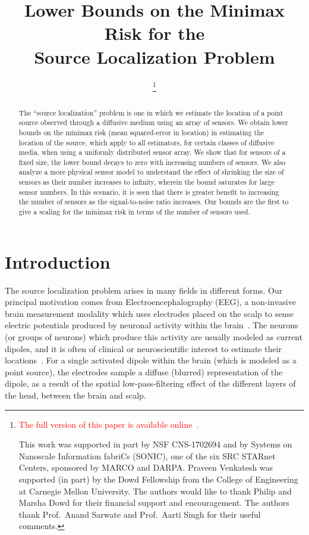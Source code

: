 \documentclass[conference,letterpaper]{IEEEtran}
\title{Lower Bounds on the Minimax Risk for the \\ Source Localization Problem}
\author{
	\IEEEauthorblockN{
		Praveen Venkatesh (\texttt{vpraveen@cmu.edu}) %
		and Pulkit Grover (\texttt{pulkit@cmu.edu}) %
	}
	\IEEEauthorblockA{
		Electrical \& Computer Engineering,
		and the Center for the Neural Basis of Cognition,
		Carnegie Mellon University
	}
	\thanks{
	\textcolor{red}{The full version of this paper is available online~\cite{FullVersion}.}

	This work was supported in part by NSF CNS-1702694 and by Systems on
	Nanoscale Information fabriCs (SONIC), one of the six SRC STARnet Centers,
	sponsored by MARCO and DARPA.  Praveen Venkatesh was supported (in part) by
	the Dowd Fellowship from the College of Engineering at Carnegie Mellon
	University.  The authors would like to thank Philip and Marsha Dowd for
	their financial support and encouragement. The authors thank Prof.\ Anand
	Sarwate and Prof.\ Aarti Singh for their useful comments.
	}
	\vspace{-0.25in}
}
\begin{document}
\maketitle
\thispagestyle{plain}
\pagestyle{plain}

\begin{abstract}

The ``source localization'' problem is one in which we estimate the location of
a point source observed through a diffusive medium using an array of sensors.
We obtain lower bounds on the minimax risk (mean squared-error in location) in
estimating the location of the source, which apply to all estimators, for
certain classes of diffusive media, when using a uniformly distributed sensor
array. We show that for sensors of a fixed size, the lower bound decays to zero
with increasing numbers of sensors. We also analyze a more physical sensor
model to understand the effect of shrinking the size of sensors as their number
increases to infinity, wherein the bound saturates for large sensor numbers.
In this scenario, it is seen that there is greater benefit to increasing the
number of sensors as the signal-to-noise ratio increases.  Our bounds are the
first to give a scaling for the minimax risk in terms of the number of sensors
used.


\end{abstract}

\section{Introduction}

The source localization problem arises in many fields in different forms. Our
principal motivation comes from Electroencephalography (EEG), a non-invasive
brain measurement modality which uses electrodes placed on the scalp to sense
electric potentials produced by neuronal activity within the
brain~\cite{Nunez2006Electric}. The neurons (or groups of neurons) which
produce this activity are usually modeled as current dipoles, and it is often
of clinical or neuroscientific interest to estimate their
locations~\cite{Baillet2001Electromagnetic}. For a single activated dipole
within the brain (which is modeled as a point source), the electrodes sample a
diffuse (blurred) representation of the dipole, as a result of the spatial
low-pass-filtering effect of the different layers of the head, between the
brain and scalp.
\end{document}
